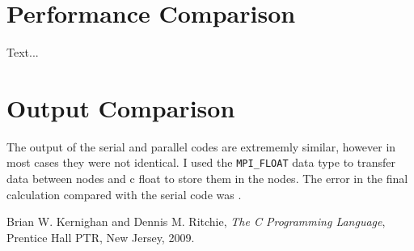 \documentclass{article}
\begin{document}
\section{Performance Comparison}
Text...

\section{Output Comparison}
The output of the serial and parallel codes are extrememly similar, however in most cases they were not identical. I used the \verb!MPI_FLOAT! data type to transfer data between nodes and c float to store them in the nodes. The error in the final calculation compared with the serial code was .

\begin{thebibliography}{9}

  Brian W. Kernighan and Dennis M. Ritchie,
  \emph{The C Programming Language},
  Prentice Hall PTR, New Jersey,
  2009.

\end{thebibliography}
\end{document}
